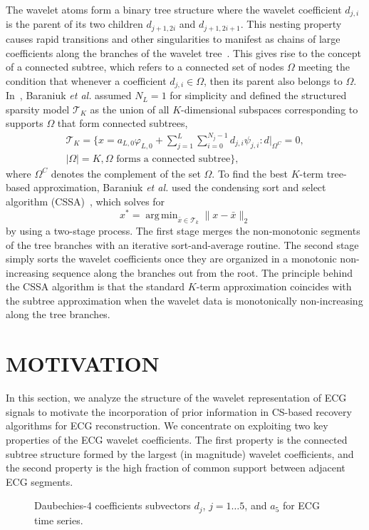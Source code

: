 \documentclass[journal]{IEEEtran}
\DeclareMathOperator*{\argmin}{arg\,min}
\begin{document}
The wavelet atoms form a binary tree structure where the wavelet coefficient $d_{j,i}$ is the parent of its two children $d_{j+1,2i}$ and $d_{j+1, 2i+1}$. This nesting property causes rapid transitions and other singularities to manifest as chains of large coefficients along the branches of the wavelet tree~\cite{Crou98}. This gives rise to the concept of a connected subtree, which refers to a connected set of nodes $\Omega$ meeting the condition that whenever a coefficient $d_{j,i}\in\Omega$, then its parent also belongs to $\Omega$. In~\cite{Bara10}, Baraniuk \textit{et al.} assumed $N_L=1$ for simplicity and defined the structured sparsity model $\mathcal{T}_K$ as the union of all $K$-dimensional subspaces corresponding to supports $\Omega$ that form connected subtrees,
\begin{multline}
    \mathcal{T}_K=\bigg\{x=a_{L,0}\varphi_{L,0}+\displaystyle\sum\limits_{j=1}^{L}\displaystyle\sum\limits_{i=0}^{N_j-1}d_{j,i}\psi_{j,i}: d|_{\Omega^C}=0, \\
    |\Omega|=K, \Omega \mbox{ forms a connected subtree} \bigg\},
\end{multline}
where $\Omega^C$ denotes the complement of the set $\Omega$.
To find the best $K$-term tree-based approximation,  Baraniuk \textit{et al.} used the condensing sort and select algorithm (CSSA)~\cite{Bara02}, which solves for
\begin{equation}\label{BPD2}
x^{\ast}=\argmin_{\bar{x}\in \mathcal{T}_k} \|x-\bar{x}\|_2
\end{equation}
by using a two-stage process. The first stage merges the non-monotonic segments of the tree branches with an iterative sort-and-average routine. The second stage simply sorts the wavelet coefficients once they are organized in a monotonic non-increasing sequence along the branches out from the root. The principle behind the CSSA algorithm is that the standard $K$-term approximation coincides with the subtree approximation when the wavelet data is monotonically non-increasing along the tree branches.


\section{MOTIVATION}
In this section, we analyze the structure of the wavelet representation of ECG signals to motivate the incorporation of prior information in CS-based recovery algorithms for ECG reconstruction. We concentrate on exploiting two key properties of the ECG wavelet coefficients. The first property is the connected subtree structure formed by the largest (in magnitude) wavelet coefficients, and the second property is the high fraction of common support between adjacent ECG segments.
\label{ssec:CSPKS}
\begin{figure}[t]
\caption{Daubechies-4 coefficients subvectors $d_j$, $j=1\ldots5$, and $a_5$ for ECG time series. } \label{fig:stack}
\end{figure}
\end{document}
